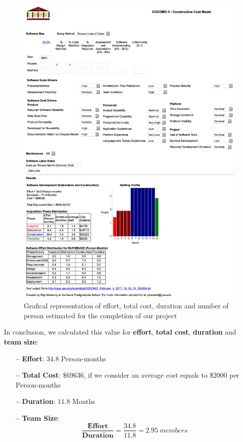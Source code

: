 \begin{figure}[htbp]
\centering
\includegraphics[width=\textwidth]{Images/cocomo_v1}
\caption{Grafical representation of effort, total cost, duration and number of person estimated for the completion of our project}
\label{fig:chart}
\end{figure}

\clearpage

In conclusion, we calculated this value for \textbf{effort}, \textbf{total cost}, \textbf{duration} and \textbf{team size}:

\begin{itemize}

\item[\textbf{--}] \textbf{Effort}: $34.8$ Person-months
\item[\textbf{--}] \textbf{Total Cost}: $\$69636$, if we consider an average cost equals to $\$2000$ per Person-months
\item[\textbf{--}] \textbf{Duration}: $11.8$ Months
\item[\textbf{--}] \textbf{Team Size}: \[\frac{\textbf{Effort}}{\textbf{Duration}} = \frac{34.8}{11.8} = 2.95\:members\] 

\end{itemize}